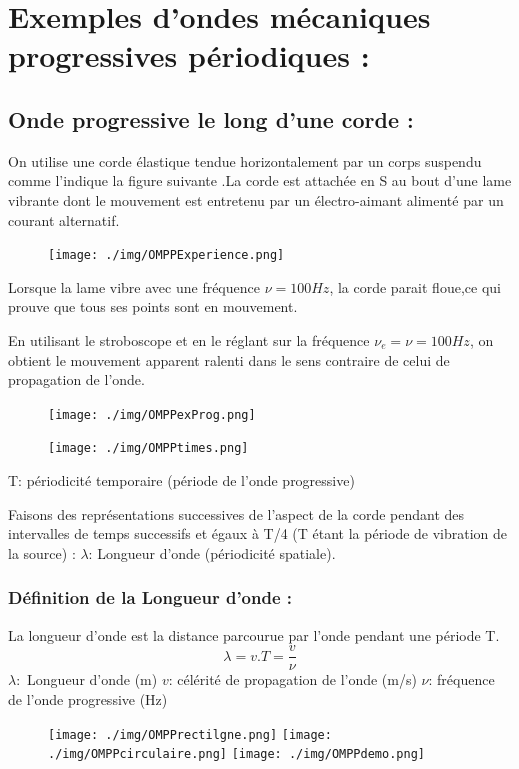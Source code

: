 \documentclass[12pt]{article}
\begin{document}
\section{Exemples d'ondes mécaniques progressives périodiques : }
\subsection{Onde progressive le long d'une corde : }
On utilise une corde élastique tendue horizontalement par un corps suspendu comme l'indique la figure suivante .La corde est attachée en S au bout d'une lame vibrante dont le mouvement est entretenu par un électro-aimant alimenté par un courant alternatif.

\begin{figure}[h]
	\begin{center}
\vspace{-0.5cm}
	\texttt{[image: ./img/OMPPExperience.png]}
\end{center}
\vspace{-2cm}
\end{figure}

Lorsque la lame vibre avec une fréquence $\nu = 100Hz$, la corde parait floue,ce qui prouve que tous ses points sont en mouvement.

En utilisant le stroboscope et en le réglant sur la fréquence $\nu_e = \nu =100Hz$, on obtient le mouvement apparent ralenti dans le sens contraire de celui de propagation de l'onde.
\begin{figure}[h]
	\begin{center}
\vspace{-0.5cm}
	\texttt{[image: ./img/OMPPexProg.png]}
\end{center}
\vspace{-1cm}
\end{figure}

\begin{figure}
	\texttt{[image: ./img/OMPPtimes.png]}
\end{figure}


T: périodicité temporaire (période de l'onde progressive)

Faisons des représentations successives de l'aspect de la corde pendant des intervalles de temps successifs et égaux à T/4 (T étant la période de vibration de la source) :
$\lambda $: Longueur d'onde (périodicité spatiale).

\subsubsection{Définition de la Longueur d'onde : }
La longueur d'onde est la distance parcourue par l'onde pendant une période T. $$\lambda = v.T = \frac{v}{\nu}$$
$\lambda:$ Longueur d'onde (m)  $v$: célérité de propagation de l'onde (m/s)  $\nu$: fréquence de l'onde progressive (Hz)
\begin{figure}[!h]
	\begin{center}
    \texttt{[image: ./img/OMPPrectilgne.png]}
\texttt{[image: ./img/OMPPcirculaire.png]}
    \texttt{[image: ./img/OMPPdemo.png]}
\end{center}
\end{figure}
\end{document}
